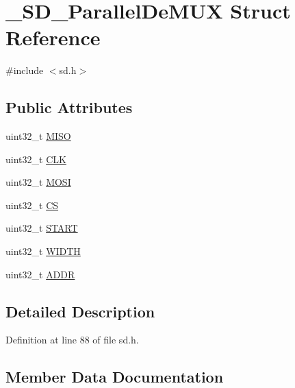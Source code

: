 \hypertarget{struct__SD__ParallelDeMUX}{}\section{\+\_\+\+S\+D\+\_\+\+Parallel\+De\+M\+UX Struct Reference}
\label{struct__SD__ParallelDeMUX}


{\ttfamily \#include $<$sd.\+h$>$}

\subsection*{Public Attributes}
\begin{DoxyCompactItemize}
\item 
uint32\+\_\+t \mbox{\hyperlink{struct__SD__ParallelDeMUX_a9e03bbfacd26a6708508402bdc640536}{M\+I\+SO}}
\item 
uint32\+\_\+t \mbox{\hyperlink{struct__SD__ParallelDeMUX_ad75cb9c0a77ac95eda9312946884621a}{C\+LK}}
\item 
uint32\+\_\+t \mbox{\hyperlink{struct__SD__ParallelDeMUX_a58d641ca0b83bf9e0f0fb99d3df376a1}{M\+O\+SI}}
\item 
uint32\+\_\+t \mbox{\hyperlink{struct__SD__ParallelDeMUX_a84626b284987bfe4cd54ad780d031f4c}{CS}}
\item 
uint32\+\_\+t \mbox{\hyperlink{struct__SD__ParallelDeMUX_a05b9cdf46f868b918ccf49e00c4726f8}{S\+T\+A\+RT}}
\item 
uint32\+\_\+t \mbox{\hyperlink{struct__SD__ParallelDeMUX_a8abd43dfbde65f31ae542e219654f2e1}{W\+I\+D\+TH}}
\item 
uint32\+\_\+t \mbox{\hyperlink{struct__SD__ParallelDeMUX_a1d0610459585385680d2f9e51f79db2d}{A\+D\+DR}}
\end{DoxyCompactItemize}


\subsection{Detailed Description}


Definition at line 88 of file sd.\+h.



\subsection{Member Data Documentation}
\mbox{\label{struct__SD__ParallelDeMUX_a1d0610459585385680d2f9e51f79db2d}} 
